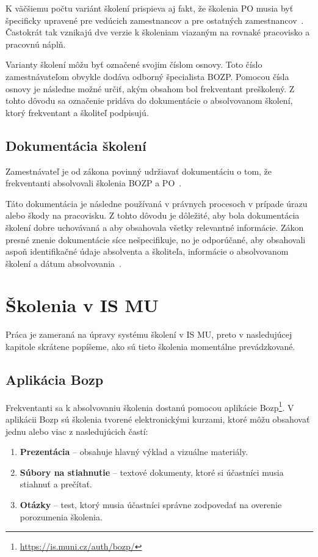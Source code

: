 \documentclass[
  digital,     %
  oneside,     %
  nosansbold,  %
  nocolorbold, %
  lof,         %
  nolot,         %
]{fithesis4}
\begin{document}
K väčšiemu počtu variánt školení prispieva aj fakt, že školenia PO musia byť špecificky upravené pre vedúcich zamestnancov a pre ostatných zamestnancov~\cite[~§16~odst.~2]{cesko_zakon_pozarni_ochrana}. Častokrát tak vznikajú dve verzie k školeniam viazaným na rovnaké pracovisko a pracovnú náplň.

Varianty školení môžu byť označené svojim číslom osnovy. Toto číslo zamestnávateľom obvykle dodáva odborný špecialista BOZP. Pomocou čísla osnovy je následne možné určiť, akým obsahom bol frekventant preškolený. Z tohto dôvodu sa označenie pridáva do dokumentácie o absolvovanom školení, ktorý frekventant a školiteľ podpisujú.

\section{Dokumentácia školení}
Zamestnávateľ je od zákona povinný udržiavať dokumentáciu o tom, že frekventanti absolvovali školenia BOZP a PO~\cites[§~103~odst.~3]{cesko_zakonik_prace}[§~27]{cesko_vyhlaska_poziarna_prevence}.

Táto dokumentácia je následne používaná v právnych procesoch v prípade úrazu alebo škody na pracovisku. Z tohto dôvodu je dôležité, aby bola dokumentácia školení dobre uchovávaná a aby obsahovala všetky relevantné informácie. Zákon presné znenie dokumentácie síce nešpecifikuje, no je odporúčané, aby obsahovali aspoň identifikačné údaje absolventa a školiteľa, informácie o absolvovanom školení a dátum absolvovania~\cite{prevent_bozp}.

\chapter{Školenia v IS MU}
\label{kap-2}
Práca je zameraná na úpravy systému školení v IS MU, preto v nasledujúcej kapitole skrátene popíšeme, ako sú tieto školenia momentálne prevádzkované. 

\section{Aplikácia Bozp}
Frekventanti sa k absolvovaniu školenia dostanú pomocou aplikácie Bozp\footnote{\url{https://is.muni.cz/auth/bozp/}}. V aplikácii Bozp sú školenia tvorené elektronickými kurzami, ktoré môžu obsahovať jednu alebo viac z nasledujúcich častí:
\begin{enumerate}
    \item \textbf{Prezentácia} – obsahuje hlavný výklad a vizuálne materiály.
    \item \textbf{Súbory na stiahnutie} – textové dokumenty, ktoré si účastníci musia stiahnuť a prečítať.
    \item \textbf{Otázky} – test, ktorý musia účastníci správne zodpovedať na overenie porozumenia školenia.~\cite[19]{kandova2019}
\end{enumerate}
\end{document}
